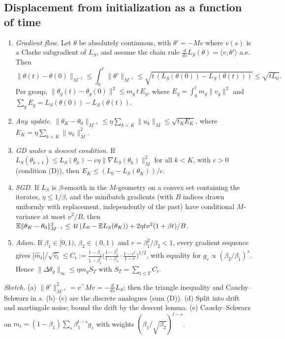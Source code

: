 \subsection{Displacement from initialization as a function of time}\label{app:networks:displacement}

\begin{theorem}\label{thm:B1}
\leavevmode
\begin{enumerate}[label=(\alph*),leftmargin=*]
\item \emph{Gradient flow.} Let $\theta$ be absolutely continuous, with $\theta'=-Mv$ where $v(s)$ is a Clarke subgradient of $L_S$, and assume the chain rule $\frac d{ds}L_S(\theta)=\langle v,\theta'\rangle$ a.e. Then
\[
\|\theta(t)-\theta(0)\|_{M^{-1}}\le\int_0^t\|\theta'\|_{M^{-1}}\le\sqrt{t\,(L_S(\theta(0))-L_S(\theta(t)))}\le\sqrt{tL_0}.
\]
Per group, $\|\theta_g(t)-\theta_g(0)\|^2\le m_g\,t\,E_g$, where $E_g=\int_0^tm_g\|v_g\|^2$ and $\sum_gE_g=L_S(\theta(0))-L_S(\theta(t))$.
\item \emph{Any update.} $\|\theta_K-\theta_0\|_{M^{-1}}\le\eta\sum_{k<K}\|u_k\|_M\le\sqrt{t_KE_K}$, where $E_K=\eta\sum_{k<K}\|u_k\|_M^2$.
\item \emph{GD under a descent condition.} If $L_S(\theta_{k+1})\le L_S(\theta_k)-c\eta\|\nabla L_S(\theta_k)\|_M^2$ for all $k<K$, with $c>0$ (condition (D)), then $E_K\le(L_0-L_S(\theta_K))/c$.
\item \emph{SGD.} If $L_S$ is $\beta$-smooth in the $M$-geometry on a convex set containing the iterates, $\eta\le1/\beta$, and the minibatch gradients (with $B$ indices drawn uniformly with replacement, independently of the past) have conditional $M$-variance at most $\nu^2/B$, then $\mathbb{E}\|\theta_K-\theta_0\|^2_{M^{-1}}\le4t\,(L_0-\mathbb{E} L_S(\theta_K))+2\eta t\nu^2(1+\beta t)/B$.
\item \emph{Adam.} If $\beta_1\in[0,1)$, $\beta_2\in(0,1)$ and $r=\beta_1^2/\beta_2<1$, every gradient sequence gives $|\hat m_t|/\sqrt{\hat v_t}\le C_t:=\frac{1-\beta_1}{1-\beta_1^t}\bigl(\frac{1-\beta_2^t}{1-\beta_2}\cdot\frac{1-r^t}{1-r}\bigr)^{1/2}$, with equality for $g_s\propto(\beta_2/\beta_1)^s$. Hence $\|\Delta\theta_g\|_\infty\le\eta m_gS_T$ with $S_T=\sum_{t\le T}C_t$.
\end{enumerate}
\end{theorem}
\noindent\emph{Sketch.} (a) $\|\theta'\|^2_{M^{-1}}=v^\top Mv=-\frac d{ds}L_S$; then the triangle inequality and Cauchy--Schwarz in $s$. (b)--(c) are the discrete analogues (sum (D)). (d) Split into drift and martingale noise; bound the drift by the descent lemma. (e) Cauchy--Schwarz on $m_t=(1-\beta_1)\sum_s\beta_1^{t-s}g_s$ with weights $(\beta_1/\sqrt{\beta_2})^{t-s}$.

